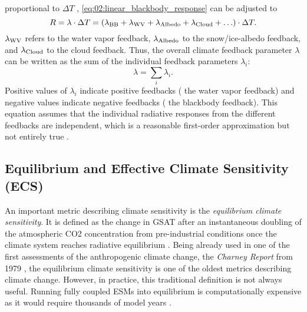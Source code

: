 proportional to $\Delta T$ \autocite{Gregory2008a},
\cref{eq:02:linear_blackbody_response} can be adjusted to
\begin{equation}
  R = \lambda \cdot \Delta T = \left( \lambda_{\textnormal{BB}} +
  \lambda_{\textnormal{WV}} + \lambda_{\textnormal{Albedo}} + \lambda_{\textnormal{Cloud}} +
  \ldots \right) \cdot \Delta T.
  \label{eq:02:linear_response}
\end{equation}
$\lambda_{\textnormal{WV}}$ refers to the water vapor feedback,
$\lambda_{\textnormal{Albedo}}$ to the snow/ice-albedo feedback, and
$\lambda_{\textnormal{Cloud}}$ to the cloud feedback. Thus, the overall climate
feedback parameter $\lambda$ can be written as the sum of the individual
feedback parameters $\lambda_i$:
\begin{equation}
  \lambda = \sum_i \lambda_i.
  \label{eq:02:lambda_as_sum_of_lambdas}
\end{equation}
Positive values of $\lambda_i$ indicate positive feedbacks (\eg{} the water
vapor feedback) and negative values indicate negative feedbacks (\eg{} the
blackbody feedback). This equation assumes that the individual radiative
responses from the different feedbacks are independent, which is a reasonable
first-order approximation but not entirely true \autocite{Soden2008}.

\subsection{Equilibrium and Effective Climate Sensitivity (\acs{ECS})}
\label{subsec:02:ecs}

An important metric describing climate sensitivity is the \emph{equilibrium
  climate sensitivity}. It is defined as the change in \ac{GSAT} after an
instantaneous doubling of the atmospheric \ac{CO2} concentration from
pre-industrial conditions once the climate system reaches radiative equilibrium
\autocite{Bindoff2013}. Being already used in one of the first assessments of
the anthropogenic climate change, the \emph{Charney Report} from 1979
\autocite{Charney1979}, the equilibrium climate sensitivity is one of the
oldest metrics describing climate change. However, in practice, this
traditional definition is not always useful. Running fully coupled \acp{ESM}
into equilibrium is computationally expensive as it would require thousands of
model years \autocite{Rugenstein2020}.

